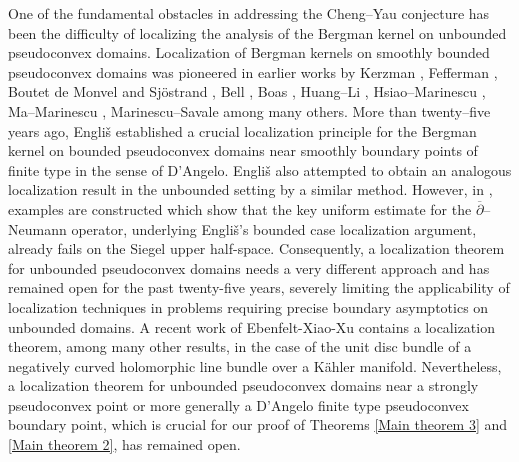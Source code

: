 \documentclass[a4paper,centertags,oneside,12pt]{amsart}
\newcommand{\CC}{\mathbb C}
\newcommand{\ov}{\overline}
\numberwithin{equation}{section}
\begin{document}


One of the  fundamental obstacles in addressing the Cheng--Yau conjecture has been the difficulty of localizing the analysis of the Bergman kernel  on unbounded pseudoconvex domains. 
Localization of Bergman kernels on smoothly bounded pseudoconvex  domains  was pioneered in earlier works by Kerzman \cite{K72}, Fefferman \cite{Fe74}, Boutet de Monvel and  Sj\"ostrand \cite{BS76}, Bell \cite{Be86}, Boas \cite{Bo87a, Bo87b}, Huang--Li \cite{HL23}, Hsiao--Marinescu \cite{HM25}, Ma--Marinescu \cite[Proposition 4.1.5]{MM07}, Marinescu--Savale \cite{MS24} among many others.
More than twenty--five  years ago, Engliš \cite{Eng01, Eng04} established a crucial localization principle for the Bergman kernel on bounded pseudoconvex domains near  smoothly boundary points of finite type in the sense of D'Angelo. Engliš also attempted to obtain an analogous localization result in the unbounded setting by a similar method. 
However, in \cite[Page 16]{G09}, examples are constructed which show that the key uniform estimate for the $\ov\partial$--Neumann operator, underlying Engliš's bounded case localization argument, already fails on the Siegel upper half-space.
Consequently, a localization theorem for unbounded pseudoconvex domains needs a very different approach and has remained open for the past twenty-five years, severely limiting the applicability of localization techniques in problems requiring precise boundary asymptotics on unbounded domains. 
A recent work of Ebenfelt-Xiao-Xu \cite{EXX25}  contains a localization  theorem, among many other results,  in the case of the unit disc bundle of a negatively curved holomorphic line bundle over a K\"ahler manifold.
Nevertheless, a localization theorem for  unbounded pseudoconvex domains near a strongly pseudoconvex point or more generally  a D'Angelo finite type pseudoconvex boundary point, which is crucial for our proof of Theorems \ref{Main theorem 3} and \ref{Main theorem 2}, has remained  open.
\end{document}
